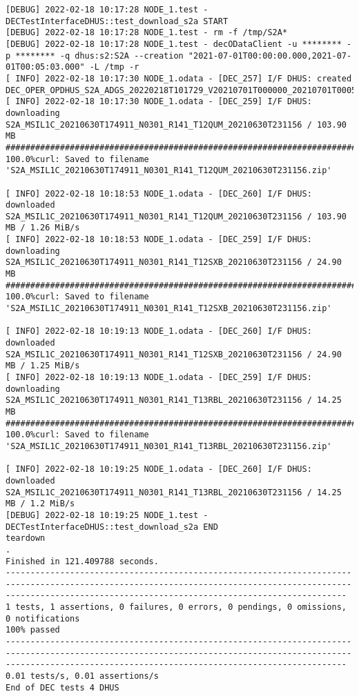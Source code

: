 \documentclass[dec_sum_main.tex]{subfiles}
\begin{document}
\begin{Verbatim}[fontsize=\tiny]
[DEBUG] 2022-02-18 10:17:28 NODE_1.test - DECTestInterfaceDHUS::test_download_s2a START
[DEBUG] 2022-02-18 10:17:28 NODE_1.test - rm -f /tmp/S2A*
[DEBUG] 2022-02-18 10:17:28 NODE_1.test - decODataClient -u ******** -p ******** -q dhus:s2:S2A --creation "2021-07-01T00:00:00.000,2021-07-01T00:05:03.000" -L /tmp -r
[ INFO] 2022-02-18 10:17:30 NODE_1.odata - [DEC_257] I/F DHUS: created DEC_OPER_OPDHUS_S2A_ADGS_20220218T101729_V20210701T000000_20210701T000503_3_0.xml
[ INFO] 2022-02-18 10:17:30 NODE_1.odata - [DEC_259] I/F DHUS: downloading S2A_MSIL1C_20210630T174911_N0301_R141_T12QUM_20210630T231156 / 103.90 MB
########################################################################################################################################################################################################## 100.0%curl: Saved to filename 'S2A_MSIL1C_20210630T174911_N0301_R141_T12QUM_20210630T231156.zip'

[ INFO] 2022-02-18 10:18:53 NODE_1.odata - [DEC_260] I/F DHUS: downloaded S2A_MSIL1C_20210630T174911_N0301_R141_T12QUM_20210630T231156 / 103.90 MB / 1.26 MiB/s
[ INFO] 2022-02-18 10:18:53 NODE_1.odata - [DEC_259] I/F DHUS: downloading S2A_MSIL1C_20210630T174911_N0301_R141_T12SXB_20210630T231156 / 24.90 MB
########################################################################################################################################################################################################## 100.0%curl: Saved to filename 'S2A_MSIL1C_20210630T174911_N0301_R141_T12SXB_20210630T231156.zip'

[ INFO] 2022-02-18 10:19:13 NODE_1.odata - [DEC_260] I/F DHUS: downloaded S2A_MSIL1C_20210630T174911_N0301_R141_T12SXB_20210630T231156 / 24.90 MB / 1.25 MiB/s
[ INFO] 2022-02-18 10:19:13 NODE_1.odata - [DEC_259] I/F DHUS: downloading S2A_MSIL1C_20210630T174911_N0301_R141_T13RBL_20210630T231156 / 14.25 MB
########################################################################################################################################################################################################## 100.0%curl: Saved to filename 'S2A_MSIL1C_20210630T174911_N0301_R141_T13RBL_20210630T231156.zip'

[ INFO] 2022-02-18 10:19:25 NODE_1.odata - [DEC_260] I/F DHUS: downloaded S2A_MSIL1C_20210630T174911_N0301_R141_T13RBL_20210630T231156 / 14.25 MB / 1.2 MiB/s
[DEBUG] 2022-02-18 10:19:25 NODE_1.test - DECTestInterfaceDHUS::test_download_s2a END
teardown
.
Finished in 121.409788 seconds.
-----------------------------------------------------------------------------------------------------------------------------------------------------------------------------------------------------------------
1 tests, 1 assertions, 0 failures, 0 errors, 0 pendings, 0 omissions, 0 notifications
100% passed
-----------------------------------------------------------------------------------------------------------------------------------------------------------------------------------------------------------------
0.01 tests/s, 0.01 assertions/s
End of DEC tests 4 DHUS
\end{Verbatim}
\end{document}
